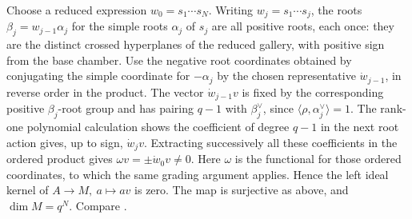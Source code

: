 \documentclass[11pt,a4paper,openany,oneside]{book}
\theoremstyle{resultstyle}
\theoremstyle{definition}
\numberwithin{equation}{chapter}
\begin{document}
Choose a reduced expression \(w_0=s_1\cdots s_N\).
Writing \(w_j=s_1\cdots s_j\), the roots
\(\beta_j=w_{j-1}\alpha_j\) for the simple roots
\(\alpha_j\) of \(s_j\) are all positive roots, each once:
they are the distinct crossed hyperplanes of the reduced
gallery, with positive sign from the base chamber.
Use the negative root coordinates obtained by conjugating
the simple coordinate for \(-\alpha_j\) by the chosen
representative \(\dot w_{j-1}\), in reverse order in
the product. The vector \(\dot w_{j-1}v\) is fixed
by the corresponding positive \(\beta_j\)-root group
and has pairing \(q-1\) with \(\beta_j^\vee\), since
\(\langle \rho,\alpha_j^\vee\rangle=1\).
The rank-one polynomial calculation shows the coefficient
of degree \(q-1\) in the next root action gives, up to sign,
\(\dot w_jv\). Extracting successively all these coefficients
in the ordered product gives \(\omega v=\pm\dot w_0v\ne0\).
Here \(\omega\) is the functional for those ordered coordinates,
to which the same grading argument applies.
Hence the left ideal kernel of \(A\to M,\ a\mapsto av\)
is zero. The map is surjective as above, and
\(\dim M=q^N\).
Compare \cite[Part~II, Sections 3.15--3.18]{jantzen}.
\end{document}
